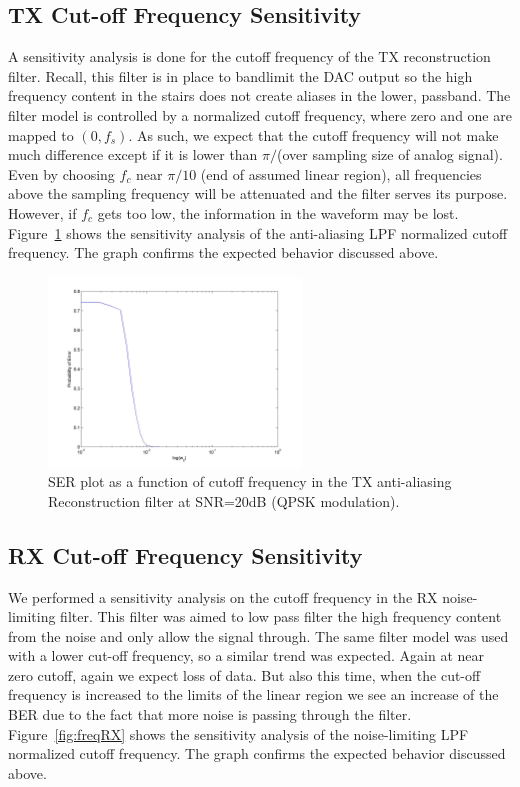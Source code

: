 \documentclass[]{article}
\begin{document}
\subsection{TX Cut-off Frequency Sensitivity}
A sensitivity analysis is done for the cutoff frequency of the TX reconstruction filter. Recall, this filter is in place to bandlimit the DAC output so the high frequency content in the stairs does not create aliases in the lower, passband. The filter model is controlled by a normalized cutoff frequency, where zero and one are mapped to $\left(0,f_s\right)$.  As such, we expect that the cutoff frequency will not make much difference except if it is lower than $\pi/$(over sampling size of analog signal).  Even by choosing $f_c$ near $\pi/10$ (end of assumed linear region), all frequencies above the sampling frequency will be attenuated and the filter serves its purpose.  However, if $f_c$ gets too low, the information in the waveform may be lost. 
Figure~\ref{fig:freqTX} shows the sensitivity analysis of the anti-aliasing LPF normalized cutoff frequency. The graph confirms the expected behavior discussed above.

\begin{figure}[H]
\centering
\includegraphics[width=0.6\textwidth]{freqTX.jpg}
\caption{SER plot as a function of cutoff frequency in the TX anti-aliasing Reconstruction filter at SNR=20dB (QPSK modulation). \label{fig:freqTX}}
\end{figure}

\subsection{RX Cut-off Frequency Sensitivity}

We performed a sensitivity analysis on the cutoff frequency in the RX noise-limiting filter. This filter was aimed to low pass filter the high frequency content from the noise and only allow the signal through. The same filter model was used with a lower cut-off frequency, so a similar trend was expected. Again at near zero cutoff, again we expect loss of data. But also this time, when the cut-off frequency is increased to the limits of the linear region we see an increase of the BER due to the fact that more noise is passing through the filter. Figure~\ref{fig:freqRX} shows the sensitivity analysis of the noise-limiting LPF normalized cutoff frequency. The graph confirms the expected behavior discussed above.
\end{document}
